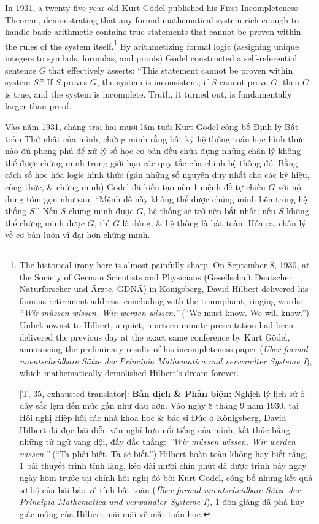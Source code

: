 \documentclass[11pt]{article}
\begin{document}
In 1931, a twenty-five-year-old Kurt G\"odel published his First Incompleteness Theorem, demonstrating that any formal mathematical system rich enough to handle basic arithmetic contains true statements that cannot be proven within the rules of the system itself.\footnote{The historical irony here is almost painfully sharp. On September 8, 1930, at the Society of German Scientists and Physicians (Gesellschaft Deutscher Naturforscher und \"Arzte, GDN\"A) in K\"onigsberg, David Hilbert delivered his famous retirement address, concluding with the triumphant, ringing words: \textit{``Wir m\"ussen wissen. Wir werden wissen.''} (``We must know. We will know.'') Unbeknownst to Hilbert, a quiet, nineteen-minute presentation had been delivered the previous day at the exact same conference by Kurt G\"odel, announcing the preliminary results of his incompleteness paper (\textit{\"Uber formal unentscheidbare S\"atze der Principia Mathematica und verwandter Systeme I}), which mathematically demolished Hilbert's dream forever.
	
	\textsf{[T, 35, exhausted translator]:} \textbf{Bản dịch \& Phản biện:} Nghịch lý lịch sử ở đây sắc lẹm đến mức gần như đau đớn. Vào ngày 8 tháng 9 năm 1930, tại Hội nghị Hiệp hội các nhà khoa học \& bác sĩ Đức ở K\"onigsberg, David Hilbert đã đọc bài diễn văn nghỉ hưu nổi tiếng của mình, kết thúc bằng những từ ngữ vang dội, đầy đắc thắng: \textit{''Wir m\"ussen wissen. Wir werden wissen.''} (``Ta phải biết. Ta sẽ biết.'') Hilbert hoàn toàn không hay biết rằng, 1 bài thuyết trình tĩnh lặng, kéo dài mười chín phút đã được trình bày ngay ngày hôm trước tại chính hội nghị đó bởi Kurt G\"odel, công bố những kết quả sơ bộ của bài báo về tính bất toàn (\textit{\"Uber formal unentscheidbare S\"atze der Principia Mathematica und verwandter Systeme I}), 1 đòn giáng đã phá hủy giấc mộng của Hilbert mãi mãi về mặt toán học.} By arithmetizing formal logic (assigning unique integers to symbols, formulas, and proofs) G\"odel constructed a self-referential sentence $G$ that effectively asserts: ``This statement cannot be proven within system $S$.'' If $S$ proves $G$, the system is inconsistent; if $S$ cannot prove $G$, then $G$ is true, and the system is incomplete. Truth, it turned out, is fundamentally larger than proof.

Vào năm 1931, chàng trai hai mươi lăm tuổi Kurt G\"odel công bố Định lý Bất toàn Thứ nhất của mình, chứng minh rằng bất kỳ hệ thống toán học hình thức nào đủ phong phú để xử lý số học cơ bản đều chứa đựng những chân lý không thể được chứng minh trong giới hạn các quy tắc của chính hệ thống đó. Bằng cách số học hóa logic hình thức (gán những số nguyên duy nhất cho các ký hiệu, công thức, \& chứng minh) G\"odel đã kiến tạo nên 1 mệnh đề tự chiếu $G$ với nội dung tóm gọn như sau: ``Mệnh đề này không thể được chứng minh bên trong hệ thống $S$.'' Nếu $S$ chứng minh được $G$, hệ thống sẽ trở nên bất nhất; nếu $S$ không thể chứng minh được $G$, thì $G$ là đúng, \& hệ thống là bất toàn. Hóa ra, chân lý về cơ bản luôn vĩ đại hơn chứng minh.
\end{document}

